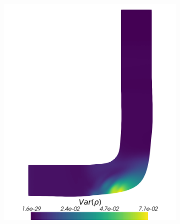 \begin{figure}[H]
\begin{subfigure}{0.3\linewidth}
		\includegraphics[scale=0.18]{figs/pipe/euler2D_pipe_n1-4_tg1-3_VarRho.png}
		\caption{}
		\label{fig:adIPMSolutionsPipeTGVar}
	\end{subfigure}
	\hfill
	\begin{subfigure}{0.3\linewidth}
		\centering

\end{subfigure}
\end{figure}

